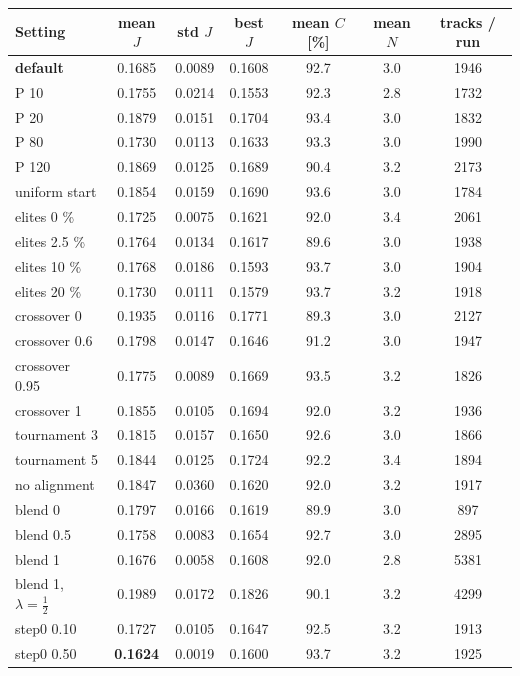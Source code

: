 \begin{tabular}{@{}lcccccc@{}}
\toprule
Setting & mean $J$ & std $J$ & best $J$ & mean $C$ [\%] & mean $N$ & tracks / run \\
\midrule
\textbf{default} & 0.1685 & 0.0089 & 0.1608 & 92.7 & 3.0 & 1946 \\
P 10 & 0.1755 & 0.0214 & 0.1553 & 92.3 & 2.8 & 1732 \\
P 20 & 0.1879 & 0.0151 & 0.1704 & 93.4 & 3.0 & 1832 \\
P 80 & 0.1730 & 0.0113 & 0.1633 & 93.3 & 3.0 & 1990 \\
P 120 & 0.1869 & 0.0125 & 0.1689 & 90.4 & 3.2 & 2173 \\
uniform start & 0.1854 & 0.0159 & 0.1690 & 93.6 & 3.0 & 1784 \\
elites 0 \% & 0.1725 & 0.0075 & 0.1621 & 92.0 & 3.4 & 2061 \\
elites 2.5 \% & 0.1764 & 0.0134 & 0.1617 & 89.6 & 3.0 & 1938 \\
elites 10 \% & 0.1768 & 0.0186 & 0.1593 & 93.7 & 3.0 & 1904 \\
elites 20 \% & 0.1730 & 0.0111 & 0.1579 & 93.7 & 3.2 & 1918 \\
crossover 0 & 0.1935 & 0.0116 & 0.1771 & 89.3 & 3.0 & 2127 \\
crossover 0.6 & 0.1798 & 0.0147 & 0.1646 & 91.2 & 3.0 & 1947 \\
crossover 0.95 & 0.1775 & 0.0089 & 0.1669 & 93.5 & 3.2 & 1826 \\
crossover 1 & 0.1855 & 0.0105 & 0.1694 & 92.0 & 3.2 & 1936 \\
tournament 3 & 0.1815 & 0.0157 & 0.1650 & 92.6 & 3.0 & 1866 \\
tournament 5 & 0.1844 & 0.0125 & 0.1724 & 92.2 & 3.4 & 1894 \\
no alignment & 0.1847 & 0.0360 & 0.1620 & 92.0 & 3.2 & 1917 \\
blend 0 & 0.1797 & 0.0166 & 0.1619 & 89.9 & 3.0 & 897 \\
blend 0.5 & 0.1758 & 0.0083 & 0.1654 & 92.7 & 3.0 & 2895 \\
blend 1 & 0.1676 & 0.0058 & 0.1608 & 92.0 & 2.8 & 5381 \\
blend 1, $\lambda=\frac12$ & 0.1989 & 0.0172 & 0.1826 & 90.1 & 3.2 & 4299 \\
step0 0.10 & 0.1727 & 0.0105 & 0.1647 & 92.5 & 3.2 & 1913 \\
step0 0.50 & \textbf{0.1624} & 0.0019 & 0.1600 & 93.7 & 3.2 & 1925 \\
\bottomrule
\end{tabular}
